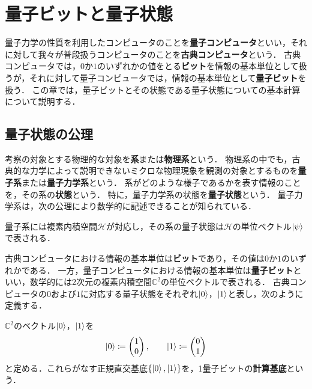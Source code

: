 \section{量子ビットと量子状態}
\label{sec:qubit-state}

量子力学の性質を利用したコンピュータのことを\textbf{量子コンピュータ}といい，それに対して我々が普段扱うコンピュータのことを\textbf{古典コンピュータ}という．
古典コンピュータでは，$0$か$1$のいずれかの値をとる\textbf{ビット}を情報の基本単位として扱うが，それに対して量子コンピュータでは，情報の基本単位として\textbf{量子ビット}を扱う．
この章では，量子ビットとその状態である量子状態についての基本計算について説明する．

\subsection{量子状態の公理}

考察の対象とする物理的な対象を\textbf{系}または\textbf{物理系}という．
物理系の中でも，古典的な力学によって説明できないミクロな物理現象を観測の対象とするものを\textbf{量子系}または\textbf{量子力学系}という．
系がどのような様子であるかを表す情報のことを，その系の\textbf{状態}という．
特に，量子力学系の状態を\textbf{量子状態}という．
量子力学系は，次の公理により数学的に記述できることが知られている．

\begin{axiom}[量子状態]
  \label{ax:quantum-state}
  量子系には複素内積空間$\mathcal H$が対応し，その系の量子状態は$\mathcal H$の単位ベクトル$\ket{\psi}$で表される．
\end{axiom}

古典コンピュータにおける情報の基本単位は\textbf{ビット}であり，その値は$0$か$1$のいずれかである．
一方，量子コンピュータにおける情報の基本単位は\textbf{量子ビット}といい，数学的には2次元の複素内積空間$\mathbb C^2$の単位ベクトルで表される．
古典コンピュータの$0$および$1$に対応する量子状態をそれぞれ$\ket{0}$，$\ket{1}$と表し，次のように定義する．

\begin{defi}[計算基底]
  $\mathbb C^2$のベクトル$\ket{0}$，$\ket{1}$を
  \begin{equation*}
    \ket{0}\coloneq\begin{pmatrix}1\\0\end{pmatrix},
    \qquad
    \ket{1}\coloneq\begin{pmatrix}0\\1\end{pmatrix}
  \end{equation*}
  と定める．これらがなす正規直交基底$\{\ket{0},\ket{1}\}$を，1量子ビットの\textbf{計算基底}という．
\end{defi}

